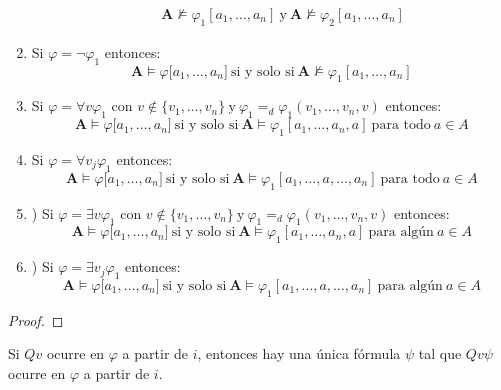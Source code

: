 \begin{lemma}
\begin{enumerate}
\begin{eqnarray*}
        && \mathbf{A} \not\models \varphi_{1}[a_{1}, \dotsc, a_{n}] \ \text{y} \ \mathbf{A} \not\models \varphi_{2}
        [a_{1}, \dotsc, a_{n}]
      \end{eqnarray*}
      \item Si $\varphi = \lnot \varphi_{1}$ entonces:
      \[
        \mathbf{A} \models \varphi \lbrack a_{1}, \dotsc, a_{n}] \ \text{si y solo si} \ \mathbf{A} \not\models
        \varphi_{1}[a_{1}, \dotsc, a_{n}]
      \]
      \item Si $\varphi = \forall v\varphi_{1}$ con $v\not\in \{v_{1}, \dotsc, v_{n}\} \ \text{y} \ \varphi_{1} =_{d}
      \varphi_{1}(v_{1}, \dotsc, v_{n}, v)$ entonces:
      \[
        \mathbf{A} \models \varphi \lbrack a_{1}, \dotsc, a_{n}] \ \text{si y solo si} \ \mathbf{A} \models \varphi_{1}
        [a_{1}, \dotsc, a_{n},a] \ \text{para todo} \ a \in A
      \]
      \item Si $\varphi = \forall v_{j}\varphi_{1}$ entonces:
      \[
        \mathbf{A} \models \varphi \lbrack a_{1}, \dotsc, a_{n}] \ \text{si y solo si} \ \mathbf{A} \models \varphi_{1}
        [a_{1}, \dotsc, a, \dotsc, a_{n}] \ \text{para todo} \ a \in A
      \]
      \item) Si $\varphi = \exists v\varphi_{1}$ con $v\not\in \{v_{1}, \dotsc, v_{n}\} \ \text{y} \ \varphi_{1} =_{d}
      \varphi_{1}(v_{1}, \dotsc, v_{n}, v)$ entonces:
      \[
        \mathbf{A} \models \varphi \lbrack a_{1}, \dotsc, a_{n}] \ \text{si y solo si} \ \mathbf{A} \models \varphi_{1}
        [a_{1}, \dotsc, a_{n}, a] \ \text{para algún} \ a \in A
      \]
      \item) Si $\varphi = \exists v_{j}\varphi_{1}$ entonces:
      \[
        \mathbf{A} \models \varphi \lbrack a_{1}, \dotsc, a_{n}] \ \text{si y solo si} \ \mathbf{A} \models \varphi_{1}
        [a_{1}, \dotsc, a, \dotsc, a_{n}] \ \text{para algún} \ a \in A
      \]
    \end{enumerate}
  \end{lemma}
  \begin{proof}
  \end{proof}

  \begin{lemma} \label{lemma_63}
    \PN Si $Qv$ ocurre en $\varphi$ a partir de $i$, entonces hay una única fórmula $\psi$ tal que $Qv\psi$ ocurre en
    $\varphi$ a partir de $i$.
  \end{lemma}

